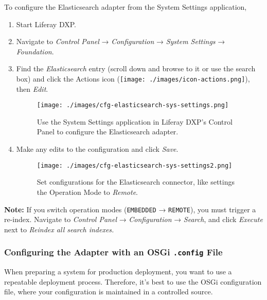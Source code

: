 To configure the Elasticsearch adapter from the System Settings
application,

\begin{enumerate}
\def\labelenumi{\arabic{enumi}.}
\item
  Start Liferay DXP.
\item
  Navigate to \emph{Control Panel} → \emph{Configuration} → \emph{System
  Settings} → \emph{Foundation}.
\item
  Find the \emph{Elasticsearch} entry (scroll down and browse to it or
  use the search box) and click the Actions icon
  (\texttt{[image: ./images/icon-actions.png]}), then \emph{Edit}.

  \begin{figure}
  \centering
  \texttt{[image: ./images/cfg-elasticsearch-sys-settings.png]}
  \caption{Use the System Settings application in Liferay DXP's Control
  Panel to configure the Elasticsearch adapter.}
  \end{figure}
\item
  Make any edits to the configuration and click \emph{Save}.

  \begin{figure}
  \centering
  \texttt{[image: ./images/cfg-elasticsearch-sys-settings2.png]}
  \caption{Set configurations for the Elasticsearch connector, like
  settings the Operation Mode to \emph{Remote}.}
  \end{figure}
\end{enumerate}

\noindent\hrulefill

\textbf{Note:} If you switch operation modes (\texttt{EMBEDDED} →
\texttt{REMOTE}), you must trigger a re-index. Navigate to \emph{Control
Panel} → \emph{Configuration} → \emph{Search}, and click \emph{Execute}
next to \emph{Reindex all search indexes.}

\noindent\hrulefill

\subsubsection{\texorpdfstring{Configuring the Adapter with an OSGi
\texttt{.config}
File}{Configuring the Adapter with an OSGi .config File}}\label{configuring-the-adapter-with-an-osgi-.config-file}

When preparing a system for production deployment, you want to use a
repeatable deployment process. Therefore, it's best to use the OSGi
configuration file, where your configuration is maintained in a
controlled source.

